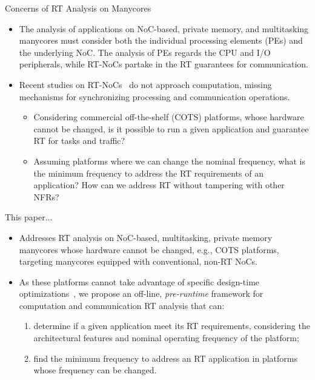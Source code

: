\begin{frame}{Concerns of RT Analysis on Manycores}
	\begin{itemize}
		\item The analysis of applications on NoC-based, private memory, and multitasking manycores must consider both the individual processing elements (PEs) and the underlying NoC. The analysis of PEs regards the CPU and I/O peripherals, while RT-NoCs partake in the RT guarantees for communication. 
		
		\item Recent studies on RT-NoCs~\cite{Deniziak:2018, chen:2020, Picornell:2019} do not approach computation, missing mechanisms for synchronizing processing and communication operations. 
		
		\begin{itemize}
		\item Considering commercial off-the-shelf (COTS) platforms, whose hardware cannot be changed, is it possible to run a given application and guarantee RT for tasks and traffic? 
		
		\item Assuming platforms where we can change the nominal frequency, what is the minimum frequency to address the RT requirements of an application? How can we address RT without tampering with other NFRs?
		\end{itemize}
	\end{itemize}
\end{frame}


\begin{frame}{This paper...}
	\begin{itemize}
		\item Addresses RT analysis on NoC-based, multitasking, private memory manycores whose hardware cannot be changed, e.g., COTS platforms, targeting manycores equipped with conventional, non-RT NoCs. 
		
		\item As these platforms cannot take advantage of specific design-time optimizations~\cite{Esperanto,Bohnenstiehl}, we propose an off-line, \textit{pre-runtime} framework for computation and communication RT analysis that can:%
		
		\begin{enumerate}
			\item determine if a given application meet its RT requirements, considering the architectural features and nominal operating frequency of the platform;
			\item find the minimum frequency to address an RT application in platforms whose frequency can be changed.   
		\end{enumerate}
		
	\end{itemize}
\end{frame}

